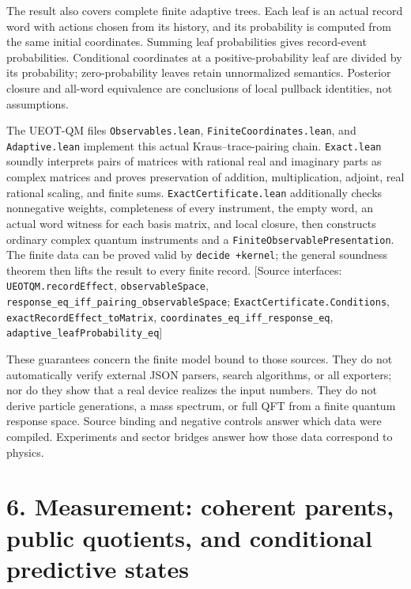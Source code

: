 \documentclass[
  11pt,
  oneside]{book}
\begin{document}
The result also covers complete finite adaptive trees. Each leaf is an
actual record word with actions chosen from its history, and its
probability is computed from the same initial coordinates. Summing leaf
probabilities gives record-event probabilities. Conditional coordinates
at a positive-probability leaf are divided by its probability;
zero-probability leaves retain unnormalized semantics. Posterior closure
and all-word equivalence are conclusions of local pullback identities,
not assumptions.

The UEOT-QM files \texttt{Observables.\allowbreak lean},
\texttt{Finite\allowbreak Coordinates.\allowbreak lean}, and \texttt{Adaptive.\allowbreak lean} implement
this actual Kraus--trace-pairing chain. \texttt{Exact.\allowbreak lean} soundly
interprets pairs of matrices with rational real and imaginary parts as
complex matrices and proves preservation of addition, multiplication,
adjoint, real rational scaling, and finite sums.
\texttt{Exact\allowbreak Certificate.\allowbreak lean} additionally checks nonnegative weights,
completeness of every instrument, the empty word, an actual word witness
for each basis matrix, and local closure, then constructs ordinary
complex quantum instruments and a \texttt{Finite\allowbreak Observable\allowbreak Presentation}.
The finite data can be proved valid by \texttt{decide\ +kernel}; the
general soundness theorem then lifts the result to every finite record.
{[}Source interfaces: \texttt{UEOTQM.\allowbreak record\allowbreak Effect},
\texttt{observable\allowbreak Space},
\texttt{response\_\allowbreak eq\_\allowbreak iff\_\allowbreak pairing\_\allowbreak observable\allowbreak Space};
\texttt{Exact\allowbreak Certificate.\allowbreak Conditions},
\texttt{exact\allowbreak Record\allowbreak Effect\_\allowbreak to\allowbreak Matrix},
\texttt{coordinates\_\allowbreak eq\_\allowbreak iff\_\allowbreak response\_\allowbreak eq},
\texttt{adaptive\_\allowbreak leaf\allowbreak Probability\_\allowbreak eq}{]}

These guarantees concern the finite model bound to those sources. They
do not automatically verify external JSON parsers, search algorithms, or
all exporters; nor do they show that a real device realizes the input
numbers. They do not derive particle generations, a mass spectrum, or
full QFT from a finite quantum response space. Source binding and
negative controls answer which data were compiled. Experiments and
sector bridges answer how those data correspond to physics.

\chapter{6. Measurement: coherent parents, public quotients, and
conditional predictive states}\label{ch-6}
\end{document}
